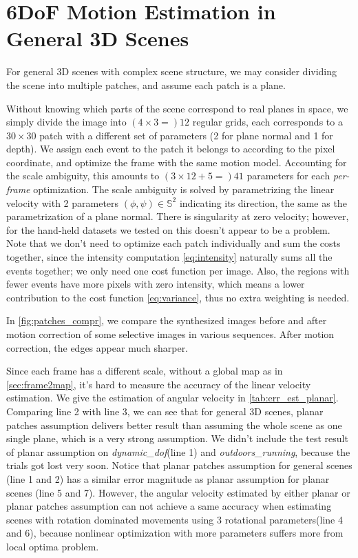   \chapter{6DoF Motion Estimation in General 3D Scenes}
  \label{chap:general_scene}

  For general 3D scenes with complex scene structure, we may consider
  dividing the scene into multiple patches, and assume each patch is a
  plane.

  Without knowing which parts of the scene correspond to real planes
  in space, we simply divide the image into $(4\times3=)12$ regular
  grids, each corresponds to a $30\times30$ patch with a different set
  of parameters (2 for plane normal and 1 for depth). We assign each
  event to the patch it belongs to according to the pixel coordinate,
  and optimize the frame with the same motion model. Accounting for
  the scale ambiguity, this amounts to $(3\times12+5=)41$ parameters
  for each \textit{per-frame} optimization. The scale ambiguity is
  solved by parametrizing the linear velocity with 2 parameters
  $(\phi,\psi)\in\mathbb{S}^2$ indicating its direction, the same as
  the parametrization of a plane normal. There is singularity at zero
  velocity; however, for the hand-held datasets we tested on this
  doesn't appear to be a problem.  Note that we don't need to optimize
  each patch individually and sum the costs together, since the
  intensity computation \cref{eq:intensity} naturally sums all the
  events together; we only need one cost function per image. Also, the
  regions with fewer events have more pixels with zero intensity,
  which means a lower contribution to the cost function
  \cref{eq:variance}, thus no extra weighting is needed.

  In \cref{fig:patches_compr}, we compare the synthesized images
  before and after motion correction of some selective images in
  various sequences. After motion correction, the edges appear much
  sharper.

  Since each frame has a different scale, without a global map as in
  \cref{sec:frame2map}, it's hard to measure the accuracy of the
  linear velocity estimation. We give the estimation of angular
  velocity in \cref{tab:err_est_planar}. Comparing line 2 with line 3,
  we can see that for general 3D scenes, planar patches assumption
  delivers better result than assuming the whole scene as one single
  plane, which is a very strong assumption. We didn't include the test
  result of planar assumption on \emph{dynamic\_dof}(line 1) and
  \emph{outdoors_running}, because the trials got lost very
  soon. Notice that planar patches assumption for general scenes (line
  1 and 2) has a similar error magnitude as planar assumption for
  planar scenes (line 5 and 7). However, the angular velocity
  estimated by either planar or planar patches assumption can not
  achieve a same accuracy when estimating scenes with rotation
  dominated movements using 3 rotational parameters(line 4 and 6),
  because nonlinear optimization with more parameters suffers more
  from local optima problem.


